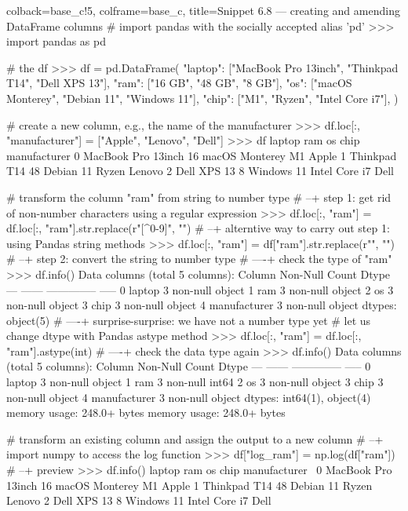 \documentclass[a4paper,11pt]{book}
\numberwithin{figure}{chapter}
\numberwithin{table}{chapter}
\begin{document}
\begin{pythoncode}[linenos=True]{colback=base_c!5, colframe=base_c, title=\sffamily Snippet 6.8 --- creating and amending DataFrame columns}
# import pandas with the socially accepted alias 'pd'
>>> import pandas as pd

# the df
>>> df = pd.DataFrame(
        {
            "laptop": ["MacBook Pro 13inch", "Thinkpad T14", "Dell XPS 13"],
            "ram": ["16 GB", "48 GB", "8 GB"],
            "os": ["macOS Monterey", "Debian 11", "Windows 11"],
            "chip": ["M1", "Ryzen", "Intel Core i7"],
        }
)

# create a new column, e.g., the name of the manufacturer
>>> df.loc[:, "manufacturer"] = ["Apple", "Lenovo", "Dell"]
>>> df
               laptop ram              os           chip manufacturer
0  MacBook Pro 13inch  16  macOS Monterey             M1        Apple
1        Thinkpad T14  48       Debian 11          Ryzen       Lenovo
2         Dell XPS 13   8      Windows 11  Intel Core i7         Dell

# transform the column "ram" from string to number type 
# --+ step 1: get rid of non-number characters using a regular expression 
>>> df.loc[:, "ram"] = df.loc[:, "ram"].str.replace(r"[^0-9]", "")
# --+ alterntive way to carry out step 1: using Pandas string methods 
>>> df.loc[:, "ram"] = df["ram"].str.replace(r"\sGB", "")
# --+ step 2: convert the string to number type
# ----+ check the type of "ram"
>>> df.info()
Data columns (total 5 columns):
     Column        Non-Null Count  Dtype 
---  ------        --------------  ----- 
 0   laptop        3 non-null      object
 1   ram           3 non-null      object
 2   os            3 non-null      object
 3   chip          3 non-null      object
 4   manufacturer  3 non-null      object
dtypes: object(5)
# ----+ surprise-surprise: we have not a number type yet
# let us change dtype with Pandas astype method
>>> df.loc[:, "ram"] = df.loc[:, "ram"].astype(int)
# ----+ check the data type again
>>> df.info()
Data columns (total 5 columns):
     Column        Non-Null Count  Dtype 
---  ------        --------------  ----- 
 0   laptop        3 non-null      object
 1   ram           3 non-null      int64 
 2   os            3 non-null      object
 3   chip          3 non-null      object
 4   manufacturer  3 non-null      object
dtypes: int64(1), object(4)
memory usage: 248.0+ bytes
memory usage: 248.0+ bytes

# transform an existing column and assign the output to a new column 
# --+ import numpy to access the log function 
>>> df["log_ram"] = np.log(df["ram"])
# --+ preview
>>> df.info()
               laptop  ram              os           chip manufacturer  \
0  MacBook Pro 13inch   16  macOS Monterey             M1        Apple   
1        Thinkpad T14   48       Debian 11          Ryzen       Lenovo   
2         Dell XPS 13    8      Windows 11  Intel Core i7         Dell   


\end{pythoncode}
\end{document}
